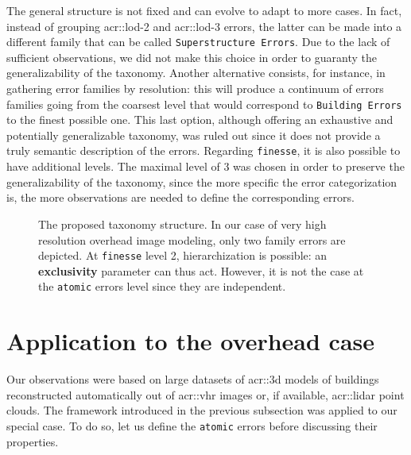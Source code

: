         The general structure is not fixed and can evolve to adapt to more cases.
        In fact, instead of grouping \gls{acr::lod}-2 and \gls{acr::lod}-3 errors, the latter can be made into a different family that can be called \texttt{Superstructure Errors}.
        Due to the lack of sufficient observations, we did not make this choice in order to guaranty the generalizability of the taxonomy.
        Another alternative consists, for instance, in gathering error families by resolution: this will produce a continuum of errors families going from the coarsest level that would correspond to \texttt{Building Errors} to the finest possible one.
        This last option, although offering an exhaustive and potentially generalizable taxonomy, was ruled out since it does not provide a truly semantic description of the errors.
        Regarding \texttt{finesse}, it is also possible to have additional levels.
        The maximal level of 3 was chosen in order to preserve the generalizability of the taxonomy, since the more specific the error categorization is, the more observations are needed to define the corresponding errors.

        \begin{figure}[htbp]
            \begin{center}
                
                \caption[
                    The proposed taxonomy structure.
                ]{
                    \label{fig::taxonomy} 
                    The proposed taxonomy structure.
                    In our case of very high resolution overhead image modeling, only two family errors are depicted.
                    At \texttt{finesse} level 2, hierarchization is possible: an \textbf{exclusivity} parameter can thus act.
                    However, it is not the case at the \texttt{atomic} errors level since they are independent.
                }
            \end{center}
        \end{figure}

\section{Application to the overhead case}
    \label{sec::semantic_evaluation::overhead}
    Our observations were based on large datasets of \gls{acr::3d} models of buildings reconstructed automatically out of \gls{acr::vhr} images or, if available, \gls{acr::lidar} point clouds.
    The framework introduced in the previous subsection was applied to our special case.
    To do so, let us define the \texttt{atomic} errors before discussing their properties.

